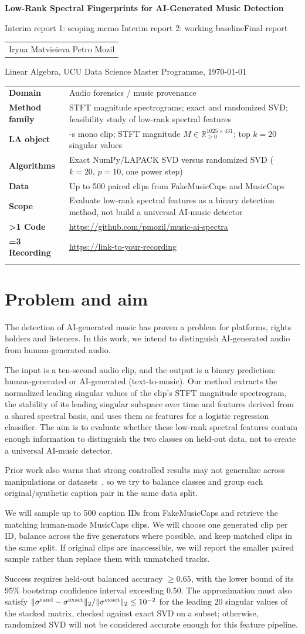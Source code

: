 \documentclass[11pt,a4paper]{article}
\makeatletter
\newcommand{\stage}{1}
\newcommand{\reporttitle}{Low-Rank Spectral Fingerprints for AI-Generated Music Detection}
\newcommand{\reportauthors}{Iryna Matvieieva \quad Petro Mozil}
\newcommand{\carddomain}{Audio forensics / music provenance}
\newcommand{\cardmethod}{STFT magnitude spectrograms; exact and randomized SVD; feasibility study of low-rank spectral features}
\newcommand{\cardobject}{10-s mono clip; STFT magnitude $M\in\mathbb{R}_{\geq0}^{1025\times431}$; top $k=20$ singular values}
\newcommand{\cardalgorithms}{Exact NumPy/LAPACK SVD versus randomized SVD ($k=20$, $p=10$, one power step)}
\newcommand{\carddata}{Up to 500 paired clips from FakeMusicCaps and MusicCaps~\cite{FakeMusicCaps}}
\newcommand{\cardreframing}{Evaluate low-rank spectral features as a binary detection method, not build a universal AI-music detector}
\newcommand{\cardcode}{\url{https://github.com/pmozil/music-ai-spectra}}
\newcommand{\cardvideo}{\url{https://link-to-your-recording}} %
\theoremstyle{plain}
\theoremstyle{definition}
\theoremstyle{remark}
\newcommand{\stagename}{\ifcase\stage\or Interim report 1: scoping memo\or
  Interim report 2: working baseline\or Final report\fi}
\newcommand{\projectcard}{%
  \noindent
  \begin{tabularx}{\linewidth}{@{}>{\raggedright\bfseries}p{3.0cm}
                                  >{\raggedright\arraybackslash}X@{}}
    \toprule
    Domain        & \carddomain \\
    Method family & \cardmethod \\
    LA object     & \cardobject \\
    Algorithms    & \cardalgorithms \\
    Data          & \carddata \\
    Scope         & \cardreframing \\
    \ifnum\stage>1 Code & \cardcode \\ \fi
    \ifnum\stage=3 Recording & \cardvideo \\ \fi
    \bottomrule
  \end{tabularx}\par}
\newcommand{\bodystart}{\label{body-start}}
\makeatother
\begin{document}
\bodystart
\begin{center}
  {\Large\bfseries \reporttitle\par}
  \medskip
  {\large \stagename\par}
  \smallskip
  \begin{tabular}{c}\reportauthors\end{tabular}\par
  \smallskip
  {\small Linear Algebra, UCU Data Science Master Programme, \today\par}
\end{center}
\projectcard
\smallskip

\section{Problem and aim}
The detection of AI-generated music has proven a problem
for platforms, rights holders and listeners. In this work,
we intend to distinguish AI-generated audio from human-generated audio.

The input is a ten-second audio clip, and the output is a binary prediction:
human-generated or AI-generated (text-to-music). Our method extracts the
normalized leading singular values of the clip's STFT magnitude spectrogram,
the stability of its leading singular subspace over time and features derived
from a shared spectral basis, and uses them as features for a logistic regression classifier.
The aim is to evaluate whether these low-rank spectral features contain
enough information to distinguish the two classes on held-out data,
not to create a universal AI-music detector.

Prior work also warns that
strong controlled results may not generalize across manipulations
or datasets~\cite{Afchar,LiBench}, so we try to balance classes
and group each original/synthetic caption pair in the same data split.

We will sample up to 500 caption IDs from FakeMusicCaps and retrieve the
matching human-made MusicCaps clips. We will choose one generated clip per ID,
balance across the five generators where possible, and keep matched clips in
the same split. If original clips are inaccessible, we will report the smaller
paired sample rather than replace them with unmatched tracks.

Success requires held-out balanced accuracy $\geq0.65$, with the lower bound
of its 95\% bootstrap confidence interval exceeding $0.50$.
The approximation must also satisfy
$\|\sigma^{\rm rand}-\sigma^{\rm exact}\|_2/\|\sigma^{\rm exact}\|_2\leq10^{-2}$ for
the leading 20 singular values of the stacked matrix, checked against exact SVD
on a subset; otherwise, randomized SVD will not be considered accurate
enough for this feature pipeline.
\end{document}
